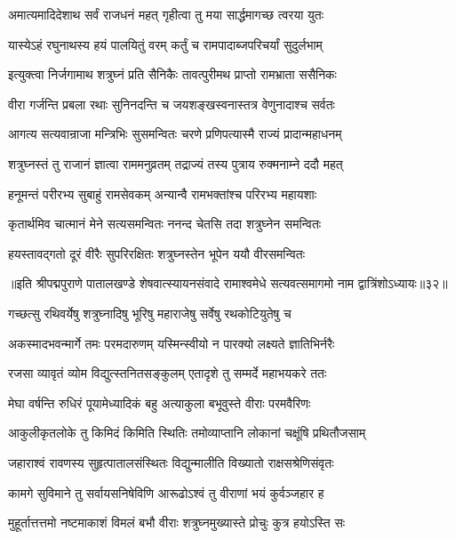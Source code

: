 \twolineshloka
{अमात्यमादिदेशाथ सर्वं राजधनं महत्}
{गृहीत्वा तु मया सार्द्धमागच्छ त्वरया युतः}%

\twolineshloka
{यास्येऽहं रघुनाथस्य हयं पालयितुं वरम्}
{कर्तुं च रामपादाब्जपरिचर्यां सुदुर्लभाम्}%

\twolineshloka
{इत्युक्त्वा निर्जगामाथ शत्रुघ्नं प्रति सैनिकैः}
{तावत्पुरीमथ प्राप्तो रामभ्राता ससैनिकः}%

\twolineshloka
{वीरा गर्जन्ति प्रबला रथाः सुनिनदन्ति च}
{जयशङ्खस्वनास्तत्र वेणुनादाश्च सर्वतः}%

\twolineshloka
{आगत्य सत्यवान्राजा मन्त्रिभिः सुसमन्वितः}
{चरणे प्रणिपत्यास्मै राज्यं प्रादान्महाधनम्}%

\twolineshloka
{शत्रुघ्नस्तं तु राजानं ज्ञात्वा राममनुव्रतम्}
{तद्राज्यं तस्य पुत्राय रुक्मनाम्ने ददौ महत्}%

\twolineshloka
{हनूमन्तं परीरभ्य सुबाहुं रामसेवकम्}
{अन्यान्वै रामभक्तांश्च परिरभ्य महायशाः}%

\twolineshloka
{कृतार्थमिव चात्मानं मेने सत्यसमन्वितः}
{ननन्द चेतसि तदा शत्रुघ्नेन समन्वितः}%

\twolineshloka
{हयस्तावद्गतो दूरं वीरैः सुपरिरक्षितः}
{शत्रुघ्नस्तेन भूपेन ययौ वीरसमन्वितः}%

{॥इति श्रीपद्मपुराणे पातालखण्डे शेषवात्स्यायनसंवादे रामाश्वमेधे सत्यवत्समागमो नाम द्वात्रिंशोऽध्यायः॥३२॥}



\twolineshloka
{गच्छत्सु रथिवर्येषु शत्रुघ्नादिषु भूरिषु}
{महाराजेषु सर्वेषु रथकोटियुतेषु च}%

\twolineshloka
{अकस्मादभवन्मार्गे तमः परमदारुणम्}
{यस्मिन्स्वीयो न पारक्यो लक्ष्यते ज्ञातिभिर्नरैः}%

\twolineshloka
{रजसा व्यावृतं व्योम विद्युत्स्तनितसङ्कुलम्}
{एतादृशे तु सम्मर्दे महाभयकरे ततः}%

\twolineshloka
{मेघा वर्षन्ति रुधिरं पूयामेध्यादिकं बहु}
{अत्याकुला बभूवुस्ते वीराः परमवैरिणः}%

\twolineshloka
{आकुलीकृतलोके तु किमिदं किमिति स्थितिः}
{तमोव्याप्तानि लोकानां चक्षूंषि प्रथितौजसाम्}%

\twolineshloka
{जहाराश्वं रावणस्य सुहृत्पातालसंस्थितः}
{विद्युन्मालीति विख्यातो राक्षसश्रेणिसंवृतः}%

\twolineshloka
{कामगे सुविमाने तु सर्वायसनिषेविणि}
{आरूढोऽश्वं तु वीराणां भयं कुर्वञ्जहार ह}%

\twolineshloka
{मुहूर्तात्तत्तमो नष्टमाकाशं विमलं बभौ}
{वीराः शत्रुघ्नमुख्यास्ते प्रोचुः कुत्र हयोऽस्ति सः}%

